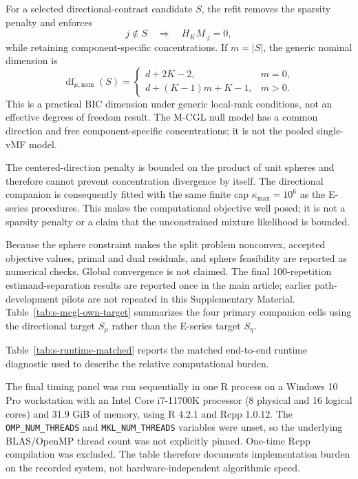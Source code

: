 \documentclass[preprint,12pt,authoryear]{elsarticle}
\begin{document}
For a selected directional-contrast candidate $S$, the refit removes the
sparsity penalty and enforces
\[
j\notin S
\quad\Longrightarrow\quad
H_KM_{\cdot j}=0,
\]
while retaining component-specific concentrations. If $m=|S|$, the
generic nominal dimension is
\[
\operatorname{df}_{\mu,\mathrm{nom}}(S)
=
\begin{cases}
d+2K-2, & m=0,\\
d+(K-1)m+K-1, & m>0.
\end{cases}
\]
This is a practical BIC dimension under generic local-rank conditions, not an
effective degrees of freedom result. The M-CGL null model has a common
direction and free component-specific concentrations; it is not the pooled
single-vMF model.

The centered-direction penalty is bounded on the product of unit spheres and
therefore cannot prevent concentration divergence by itself. The directional
companion is consequently fitted with the same finite cap
$\kappa_{\max}=10^6$ as the E-series procedures.
This makes the computational objective well posed; it is not a sparsity
penalty or a claim that the unconstrained mixture likelihood is bounded.

Because the sphere constraint makes the split problem nonconvex, accepted
objective values, primal and dual residuals, and sphere feasibility are
reported as numerical checks. Global convergence is not claimed. The final
100-repetition estimand-separation results are reported once in the main
article; earlier path-development pilots are not repeated in this Supplementary Material.
Table~\ref{tab:s-mcgl-own-target} summarizes the four primary companion cells
using the directional target $S_\mu$ rather than the E-series target $S_\eta$.



Table~\ref{tab:s-runtime-matched} reports the matched end-to-end runtime
diagnostic used to describe the relative computational burden.

The final timing panel was run sequentially in one R process on a Windows 10
Pro workstation with an Intel Core i7-11700K processor (8 physical and 16
logical cores) and 31.9 GiB of memory, using R 4.2.1 and Rcpp 1.0.12. The
\texttt{OMP\_NUM\_THREADS} and \texttt{MKL\_NUM\_THREADS} variables were unset,
so the underlying BLAS/OpenMP thread count was not explicitly pinned. One-time
Rcpp compilation was excluded. The table therefore documents implementation
burden on the recorded system, not hardware-independent algorithmic speed.
\end{document}
